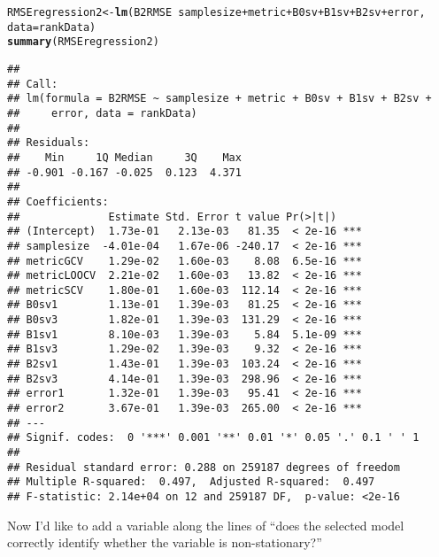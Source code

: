 \documentclass{article}\usepackage[]{graphicx}\usepackage[]{color}
\makeatletter
\newcommand{\hlopt}[1]{\textcolor[rgb]{0,0,0}{#1}}%
\newcommand{\hlstd}[1]{\textcolor[rgb]{0.345,0.345,0.345}{#1}}%
\newcommand{\hlkwb}[1]{\textcolor[rgb]{0.69,0.353,0.396}{#1}}%
\newcommand{\hlkwc}[1]{\textcolor[rgb]{0.333,0.667,0.333}{#1}}%
\newcommand{\hlkwd}[1]{\textcolor[rgb]{0.737,0.353,0.396}{\textbf{#1}}}%
\newenvironment{kframe}{%
 \def\at@end@of@kframe{}%
 \ifinner\ifhmode%
  \def\at@end@of@kframe{\end{minipage}}%
  \begin{minipage}{\columnwidth}%
 \fi\fi%
 \def\FrameCommand##1{\hskip\@totalleftmargin \hskip-\fboxsep
 \colorbox{shadecolor}{##1}\hskip-\fboxsep
     \hskip-\linewidth \hskip-\@totalleftmargin \hskip\columnwidth}%
 \MakeFramed {\advance\hsize-\width
   \@totalleftmargin\z@ \linewidth\hsize
   \@setminipage}}%
 {\par\unskip\endMakeFramed%
 \at@end@of@kframe}
\newenvironment{knitrout}{}{} %
\makeatother
\begin{document}
\begin{knitrout}
\color{fgcolor}\begin{kframe}
\begin{alltt}
\hlstd{RMSEregression2} \hlkwb{<-} \hlkwd{lm}\hlstd{(B2RMSE} \hlopt{~} \hlstd{samplesize} \hlopt{+} \hlstd{metric} \hlopt{+} \hlstd{B0sv} \hlopt{+} \hlstd{B1sv} \hlopt{+} \hlstd{B2sv} \hlopt{+} \hlstd{error,}
    \hlkwc{data} \hlstd{= rankData)}
\hlkwd{summary}\hlstd{(RMSEregression2)}
\end{alltt}
\begin{verbatim}
## 
## Call:
## lm(formula = B2RMSE ~ samplesize + metric + B0sv + B1sv + B2sv + 
##     error, data = rankData)
## 
## Residuals:
##    Min     1Q Median     3Q    Max 
## -0.901 -0.167 -0.025  0.123  4.371 
## 
## Coefficients:
##              Estimate Std. Error t value Pr(>|t|)    
## (Intercept)  1.73e-01   2.13e-03   81.35  < 2e-16 ***
## samplesize  -4.01e-04   1.67e-06 -240.17  < 2e-16 ***
## metricGCV    1.29e-02   1.60e-03    8.08  6.5e-16 ***
## metricLOOCV  2.21e-02   1.60e-03   13.82  < 2e-16 ***
## metricSCV    1.80e-01   1.60e-03  112.14  < 2e-16 ***
## B0sv1        1.13e-01   1.39e-03   81.25  < 2e-16 ***
## B0sv3        1.82e-01   1.39e-03  131.29  < 2e-16 ***
## B1sv1        8.10e-03   1.39e-03    5.84  5.1e-09 ***
## B1sv3        1.29e-02   1.39e-03    9.32  < 2e-16 ***
## B2sv1        1.43e-01   1.39e-03  103.24  < 2e-16 ***
## B2sv3        4.14e-01   1.39e-03  298.96  < 2e-16 ***
## error1       1.32e-01   1.39e-03   95.41  < 2e-16 ***
## error2       3.67e-01   1.39e-03  265.00  < 2e-16 ***
## ---
## Signif. codes:  0 '***' 0.001 '**' 0.01 '*' 0.05 '.' 0.1 ' ' 1
## 
## Residual standard error: 0.288 on 259187 degrees of freedom
## Multiple R-squared:  0.497,	Adjusted R-squared:  0.497 
## F-statistic: 2.14e+04 on 12 and 259187 DF,  p-value: <2e-16
\end{verbatim}
\end{kframe}
\end{knitrout}


Now I'd like to add a variable along the lines of ``does the selected model correctly identify whether the variable is non-stationary?''
\end{document}
